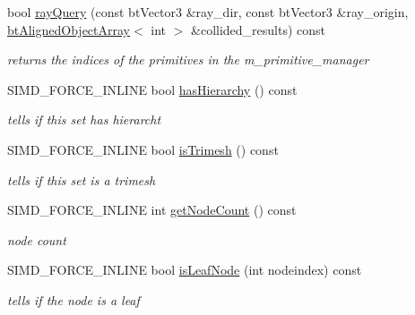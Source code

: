 \begin{DoxyCompactItemize}
bool \hyperlink{classbtGImpactQuantizedBvh_a0a97a57a30a5f014154e417f16390460}{ray\+Query} (const bt\+Vector3 \&ray\+\_\+dir, const bt\+Vector3 \&ray\+\_\+origin, \hyperlink{classbtAlignedObjectArray}{bt\+Aligned\+Object\+Array}$<$ int $>$ \&collided\+\_\+results) const
\begin{DoxyCompactList}\small\item\em returns the indices of the primitives in the m\+\_\+primitive\+\_\+manager \end{DoxyCompactList}\item 
\mbox{\label{classbtGImpactQuantizedBvh_a8468aba36949815e4d1e81f0fa51d5bb}} 
S\+I\+M\+D\+\_\+\+F\+O\+R\+C\+E\+\_\+\+I\+N\+L\+I\+NE bool \hyperlink{classbtGImpactQuantizedBvh_a8468aba36949815e4d1e81f0fa51d5bb}{has\+Hierarchy} () const
\begin{DoxyCompactList}\small\item\em tells if this set has hierarcht \end{DoxyCompactList}\item 
\mbox{\label{classbtGImpactQuantizedBvh_a7cafcae1aff83ec6bcfe066f85956dda}} 
S\+I\+M\+D\+\_\+\+F\+O\+R\+C\+E\+\_\+\+I\+N\+L\+I\+NE bool \hyperlink{classbtGImpactQuantizedBvh_a7cafcae1aff83ec6bcfe066f85956dda}{is\+Trimesh} () const
\begin{DoxyCompactList}\small\item\em tells if this set is a trimesh \end{DoxyCompactList}\item 
\mbox{\label{classbtGImpactQuantizedBvh_a7d64ae990f07eab20cc43f87712db935}} 
S\+I\+M\+D\+\_\+\+F\+O\+R\+C\+E\+\_\+\+I\+N\+L\+I\+NE int \hyperlink{classbtGImpactQuantizedBvh_a7d64ae990f07eab20cc43f87712db935}{get\+Node\+Count} () const
\begin{DoxyCompactList}\small\item\em node count \end{DoxyCompactList}\item 
\mbox{\label{classbtGImpactQuantizedBvh_a71171abb6f0c3b674ee885fc39aed215}} 
S\+I\+M\+D\+\_\+\+F\+O\+R\+C\+E\+\_\+\+I\+N\+L\+I\+NE bool \hyperlink{classbtGImpactQuantizedBvh_a71171abb6f0c3b674ee885fc39aed215}{is\+Leaf\+Node} (int nodeindex) const
\begin{DoxyCompactList}\small\item\em tells if the node is a leaf \end{DoxyCompactList}\item 

\end{DoxyCompactItemize}
